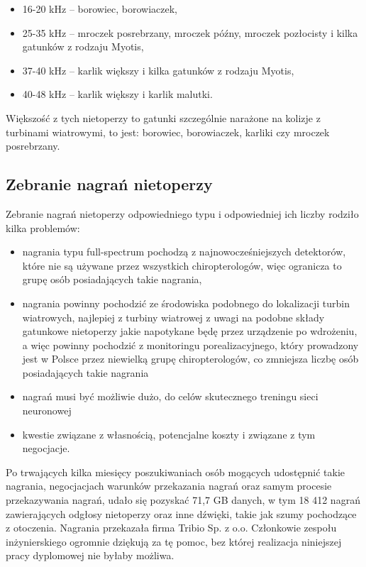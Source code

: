 \documentclass{sprz}
\begin{document}
\begin{itemize}
  \item{16-20 kHz – borowiec, borowiaczek,}
  \item{25-35 kHz – mroczek posrebrzany, mroczek późny, mroczek pozłocisty i kilka gatunków z rodzaju Myotis,}
  \item{37-40 kHz – karlik większy i kilka gatunków z rodzaju Myotis,}
  \item{40-48 kHz – karlik większy i karlik malutki.}
\end{itemize}

Większość z tych nietoperzy to gatunki szczególnie narażone na kolizje z turbinami wiatrowymi, to jest: borowiec, borowiaczek, karliki czy mroczek posrebrzany.

\subsection{Zebranie nagrań nietoperzy}
Zebranie nagrań nietoperzy odpowiedniego typu i odpowiedniej ich liczby rodziło kilka problemów:
\begin{itemize}
  \item{nagrania typu full-spectrum pochodzą z najnowocześniejszych detektorów, które nie są używane przez wszystkich chiropterologów, więc ogranicza to grupę osób posiadających takie nagrania,}
  \item{nagrania powinny pochodzić ze środowiska podobnego do lokalizacji turbin wiatrowych, najlepiej z turbiny wiatrowej z uwagi na podobne składy gatunkowe nietoperzy jakie napotykane będę przez urządzenie po wdrożeniu, a więc powinny pochodzić z monitoringu porealizacyjnego, który prowadzony jest w Polsce przez niewielką grupę chiropterologów, co zmniejsza liczbę osób posiadających takie nagrania}
  \item{nagrań musi być możliwie dużo, do celów skutecznego treningu sieci neuronowej}
  \item{kwestie związane z własnością, potencjalne koszty i związane z tym negocjacje.}
\end{itemize}

Po trwających kilka miesięcy poszukiwaniach osób mogących udostępnić takie nagrania, negocjacjach warunków przekazania nagrań oraz samym procesie przekazywania nagrań, udało się pozyskać 71,7 GB danych, w tym 18 412 nagrań zawierających odgłosy nietoperzy oraz inne dźwięki, takie jak szumy pochodzące z otoczenia. Nagrania przekazała firma Tribio Sp. z o.o. Członkowie zespołu inżynierskiego ogromnie dziękują za tę pomoc, bez której realizacja niniejszej pracy dyplomowej nie byłaby możliwa.
\end{document}
